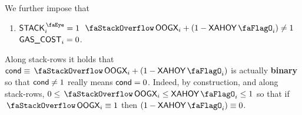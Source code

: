 
We further impose that
\begin{enumerate}[resume]
	\item
		\If $\peekStack _{i} = 1$ \et $\stackOogx _{i} + (1 - \xAhoy_{i}) \neq 1$ \Then $\textsf{GAS}\textsf{\_COST} _{i} = 0$.
\end{enumerate}
\saNote{} Along stack-rows it holds that $\col{cond} \equiv \stackOogx _{i} + (1 - \xAhoy_{i})$ is actually \textbf{binary} so that $\textsf{cond} \neq 1$ really means $\textsf{cond} = 0$.
Indeed, by construction, and along stack-rows, $0 \leq \stackOogx _{i} \leq \xAhoy_{i} \leq 1$ so that if $\stackOogx _{i} \equiv 1$ then $(1 - \xAhoy_{i}) \equiv 0$.
